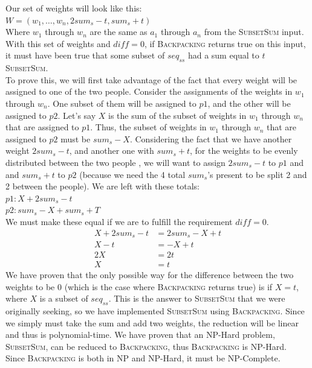 \documentclass[10pt]{article}
\begin{document}
\begin{enumerate}
{    Our set of weights will look like this: \\
    $W = (w_1, \ldots, w_n, 2sum_s - t, sum_s + t)$ \\
    Where $w_1$ through $w_n$ are the same as $a_1$ through $a_n$ from the \textsc{SubsetSum} input. With this set of weights and $diff = 0$, if \textsc{Backpacking} returns true on this input, it must have been true that some subset of $seq_{ss}$ had a sum equal to $t$ \textsc{SubsetSum}. \\ 
    To prove this, we will first take advantage of the fact that every weight will be assigned to one of the two people. Consider the assignments of the weights in $w_1$ through $w_n$. One subset of them will be assigned to $p1$, and the other will be assigned to $p2$. Let's say $X$ is the sum of the subset of weights in $w_1$ through $w_n$ that are assigned to $p1$. Thus, the subset of weights in $w_1$ through $w_n$ that are assigned to $p2$ must be $sum_s - X$. Considering the fact that we have another weight $2sum_s - t$, and another one with $sum_s + t$, for the weights to be evenly distributed between the two people , we will want to assign $2sum_s - t$ to $p1$ and and $sum_s + t$ to $p2$ (because we need the 4 total $sum_s$'s present to be split 2 and 2 between the people). We are left with these totals: \\
    $p1: X + 2sum_s - t$ \\
    $p2: sum_s - X + sum_s + T$ \\
    We must make these equal if we are to fulfill the requirement $diff = 0$. \\
    \begin{align*}
        X + 2sum_s - t &= 2sum_s - X + t \\
        X - t &= -X + t \\
        2X &= 2t \\
        X &= t
    \end{align*}
    We have proven that the only possible way for the difference between the two weights to be $0$ (which is the case where \textsc{Backpacking} returns true) is if $X = t$, where $X$ is a subset of $seq_{ss}$. This is the answer to \textsc{SubsetSum} that we were originally seeking, so we have implemented \textsc{SubsetSum} using \textsc{Backpacking}. Since we simply must take the sum and add two weights, the reduction will be linear and thus is polynomial-time. We have proven that an NP-Hard problem, \textsc{SubsetSum}, can be reduced to \textsc{Backpacking}, thus \textsc{Backpacking} is NP-Hard. \\
    Since \textsc{Backpacking} is both in NP and NP-Hard, it must be NP-Complete.
  }


\end{enumerate}
\end{document}
